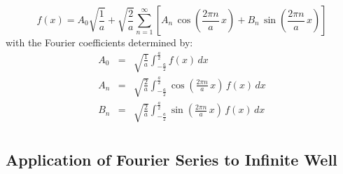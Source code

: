 \documentclass[12pt]{book}
\begin{document}
\begin{equation*}
f(x) = A_0 \sqrt{\frac{1}{a}} + \sqrt{\frac{2}{a}} \sum_{n=1}^{\infty}  \left[ A_n \, \cos\left(\frac{2\pi n}{a} \, x \right) + B_n \, \sin\left(\frac{2\pi n}{a} \, x \right)\right]\end{equation*}
with the Fourier coefficients determined by:
\begin{eqnarray*}
A_0 &=& \sqrt{\frac{1}{a}} \int_{-\frac{a}{2}}^{\frac{a}{2}} f(x) \, dx \\
A_n &=& \sqrt{\frac{2}{a}} \int_{-\frac{a}{2}}^{\frac{a}{2}} 
\cos\left(\frac{2\pi n}{a} \, x \right) \, f(x) \, dx \\
B_n &=& \sqrt{\frac{2}{a}} \int_{-\frac{a}{2}}^{\frac{a}{2}} 
\sin\left(\frac{2\pi n}{a} \, x \right) \, f(x) \, dx \\
\end{eqnarray*}


\subsection{Application of Fourier Series to Infinite Well}
\end{document}
